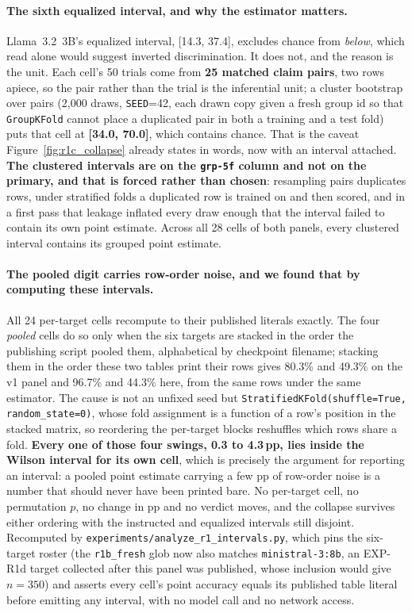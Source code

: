 \paragraph{The sixth equalized interval, and why the estimator matters.} Llama~3.2~3B's equalized interval, [14.3, 37.4], excludes chance from \emph{below}, which read alone would suggest inverted discrimination. It does not, and the reason is the unit. Each cell's 50 trials come from \textbf{25 matched claim pairs}, two rows apiece, so the pair rather than the trial is the inferential unit; a cluster bootstrap over pairs (2{,}000 draws, \texttt{SEED}=42, each drawn copy given a fresh group id so that \texttt{GroupKFold} cannot place a duplicated pair in both a training and a test fold) puts that cell at \textbf{[34.0, 70.0]}, which contains chance. That is the caveat Figure~\ref{fig:r1c_collapse} already states in words, now with an interval attached. \textbf{The clustered intervals are on the \texttt{grp-5f} column and not on the primary, and that is forced rather than chosen}: resampling pairs duplicates rows, under stratified folds a duplicated row is trained on and then scored, and in a first pass that leakage inflated every draw enough that the interval failed to contain its own point estimate. Across all 28 cells of both panels, every clustered interval contains its grouped point estimate.

\paragraph{The pooled digit carries row-order noise, and we found that by computing these intervals.} All 24 per-target cells recompute to their published literals exactly. The four \emph{pooled} cells do so only when the six targets are stacked in the order the publishing script pooled them, alphabetical by checkpoint filename; stacking them in the order these two tables print their rows gives 80.3\% and 49.3\% on the v1 panel and 96.7\% and 44.3\% here, from the same rows under the same estimator. The cause is not an unfixed seed but \texttt{StratifiedKFold(shuffle=True, random\_state=0)}, whose fold assignment is a function of a row's position in the stacked matrix, so reordering the per-target blocks reshuffles which rows share a fold. \textbf{Every one of those four swings, 0.3 to 4.3\,pp, lies inside the Wilson interval for its own cell}, which is precisely the argument for reporting an interval: a pooled point estimate carrying a few pp of row-order noise is a number that should never have been printed bare. No per-target cell, no permutation $p$, no change in pp and no verdict moves, and the collapse survives either ordering with the instructed and equalized intervals still disjoint. Recomputed by \texttt{experiments/analyze\_r1\_intervals.py}, which pins the six-target roster (the \texttt{r1b\_fresh} glob now also matches \texttt{ministral-3:8b}, an EXP-R1d target collected after this panel was published, whose inclusion would give $n\!=\!350$) and asserts every cell's point accuracy equals its published table literal before emitting any interval, with no model call and no network access.

